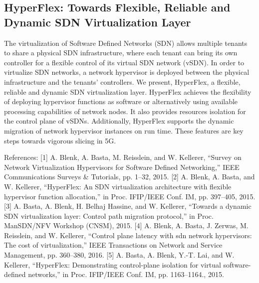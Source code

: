 \subsection{HyperFlex: Towards Flexible, Reliable and Dynamic SDN Virtualization Layer}

The virtualization of Software Defined Networks (SDN) allows multiple tenants to share a physical SDN infrastructure, where each tenant can bring its own controller for a flexible control of its virtual SDN network (vSDN). In order to virtualize SDN networks, a network hypervisor is deployed between the physical infrastructure and the tenants' controllers. We present, HyperFlex, a flexible, reliable and dynamic SDN virtualization layer. HyperFlex achieves the flexibility of deploying hypervisor functions as software or alternatively using available processing capabilities of network nodes. It also provides resources isolation for the control plane of vSDNs. Additionally, HyperFlex supports the dynamic migration of network hypervisor instances on run time. These features are key steps towards vigorous slicing in 5G.

References:
[1] A. Blenk, A. Basta, M. Reisslein, and W. Kellerer, “Survey on Network Virtualization Hypervisors
for Software Defined Networking,” IEEE Communications Surveys & Tutorials, pp. 1–32, 2015.
[2] A. Blenk, A. Basta, and W. Kellerer, “HyperFlex: An SDN virtualization architecture with flexible
hypervisor function allocation,” in Proc. IFIP/IEEE Conf. IM, pp. 397–405, 2015.
[3] A. Basta, A. Blenk, H. Belhaj Hassine, and W. Kellerer, “Towards a dynamic SDN virtualization
layer: Control path migration protocol,” in Proc. ManSDN/NFV Workshop (CNSM), 2015.
[4] A. Blenk, A. Basta, J. Zerwas, M. Reisslein, and W. Kellerer, “Control plane latency with sdn
network hypervisors: The cost of virtualization,” IEEE Transactions on Network and Service
Management, pp. 360–380, 2016.
[5] A. Basta, A. Blenk, Y.-T. Lai, and W. Kellerer, “HyperFlex: Demonstrating control-plane isolation
for virtual software-defined networks,” in Proc. IFIP/IEEE Conf. IM, pp. 1163–1164., 2015.